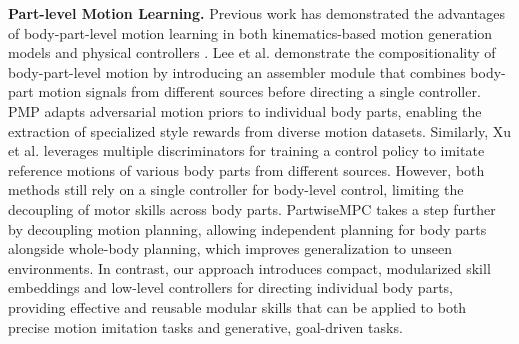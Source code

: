 \noindent \textbf{Part-level Motion Learning.} Previous work has demonstrated the advantages of body-part-level motion learning in both kinematics-based motion generation models \cite{huang2024como, wan2023tlcontrol, zhou2024emdm, zhang2023finemogen, Jang_2022} and physical controllers \cite{10.1145/3588432.3591487, https://doi.org/10.1111/cgf.15174, 10.1145/3550454.3555489}. Lee et al. \cite{10.1145/3550454.3555489} demonstrate the compositionality of body-part-level motion by introducing an assembler module that combines body-part motion signals from different sources before directing a single controller. PMP \cite{10.1145/3072959.3073602} adapts adversarial motion priors to individual body parts, enabling the extraction of specialized style rewards from diverse motion datasets. Similarly, Xu et al. \cite{composite} leverages multiple discriminators for training a control policy to imitate reference motions of various body parts from different sources. However, both methods still rely on a single controller for body-level control, limiting the decoupling of motor skills across body parts. PartwiseMPC \cite{https://doi.org/10.1111/cgf.15174} takes a step further by decoupling motion planning, allowing independent planning for body parts alongside whole-body planning, which improves generalization to unseen environments. In contrast, our approach introduces compact, modularized skill embeddings and low-level controllers for directing individual body parts, providing effective and reusable modular skills that can be applied to both precise motion imitation tasks and generative, goal-driven tasks.